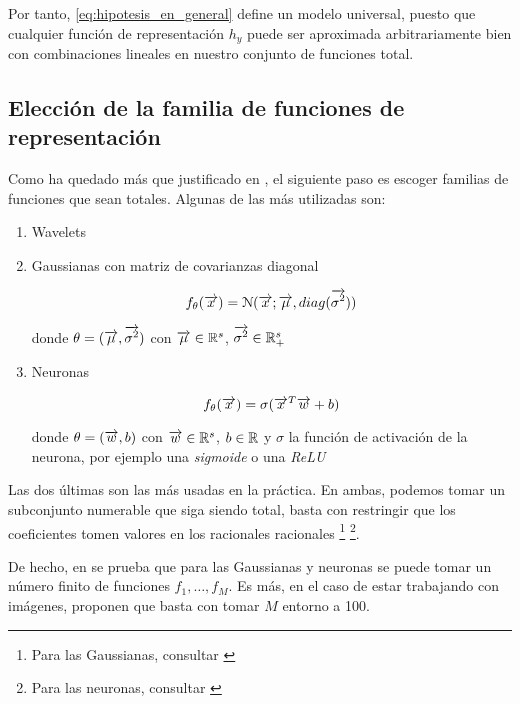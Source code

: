 Por tanto, \eqref{eq:hipotesis_en_general} define un modelo universal, puesto que cualquier función de representación $h_y$ puede ser aproximada arbitrariamente bien con combinaciones lineales en nuestro conjunto de funciones total.

\subsection{Elección de la familia de funciones de representación}


Como ha quedado más que justificado en , el siguiente paso es escoger familias de funciones que sean totales. Algunas de las más utilizadas son:

\begin{enumerate}
    \item Wavelets
    \item Gaussianas con matriz de covarianzas diagonal

        \begin{equation}
            f_\theta(\overrightarrow{x}) = \mathcal{N}(\overrightarrow{x}; \overrightarrow{\mu}, diag(\overrightarrow{\sigma^2}))
        \end{equation}

        donde $\theta = (\overrightarrow{\mu}, \overrightarrow{\sigma^2})$ con $\overrightarrow{\mu} \in \mathbb{R}^s$, $\overrightarrow{\sigma^2} \in \mathbb{R}^s_+$

    \item Neuronas

        \begin{equation}
            f_\theta(\overrightarrow{x}) = \sigma(\overrightarrow{x}^T \overrightarrow{w} + b)
        \end{equation}

        donde $\theta = (\overrightarrow{w}, b)$ con $\overrightarrow{w} \in \mathbb{R}^s$, $b \in \mathbb{R}$ y $\sigma$ la función de activación de la neurona, por ejemplo una \textit{sigmoide} o una \textit{ReLU}


\end{enumerate}

Las dos últimas son las más usadas en la práctica. En ambas, podemos tomar un subconjunto numerable que siga siendo total, basta con restringir que los coeficientes tomen valores en los racionales racionales \footnote{Para las Gaussianas, consultar \cite{matematicas:gaussianas_totales}} \footnote{Para las neuronas, consultar \cite{matematicas:principal}}.

De hecho, en \cite{matematicas:principal} se prueba que para las Gaussianas y neuronas se puede tomar un número finito de funciones ${f_1, \ldots, f_M}$. Es más, en el caso de estar trabajando con imágenes, proponen que basta con tomar $M$ entorno a 100.

